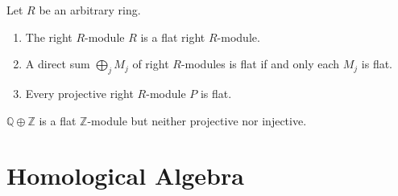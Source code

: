 \documentclass[12pt, oneside]{book}
\begin{document}
\begin{proposition}
    Let $R$ be an arbitrary ring.
    \begin{enumerate}
        \item
              The right $R$-module $R$ is a flat right $R$-module.
        \item  A direct sum $\bigoplus_j M_j$ of right $R$-modules is flat if and only each $M_j$ is flat.
        \item  Every projective right $R$-module $P$ is flat.
    \end{enumerate}
\end{proposition}


\begin{example}
    $\mathbb{Q}\oplus \mathbb{Z}$ is a flat $\mathbb{Z}$-module but neither projective nor injective.
\end{example}



















\chapter{Homological Algebra}
\end{document}
